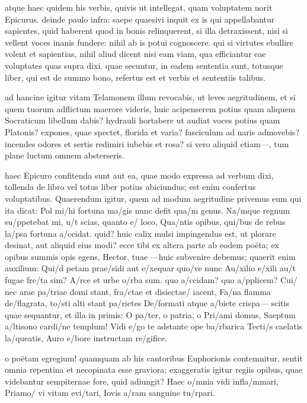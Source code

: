  atque haec quidem his verbis, quivis ut intellegat, quam voluptatem norit Epicurus. deinde paulo infra: saepe quaesivi inquit ex is qui appellabantur sapientes, quid haberent quod in bonis relinquerent, si illa detraxissent, nisi si vellent voces inanis fundere: nihil ab is potui cognoscere. qui si virtutes ebullire volent et sapientias, nihil aliud dicent nisi eam viam, qua efficiantur eae voluptates quas supra dixi. quae secuntur, in eadem sententia sunt, totusque liber, qui est de summo bono, refertus est et verbis et sententiis talibus.

 ad hancine igitur vitam Telamonem illum revocabis, ut leves aegritudinem, et si quem tuorum adflictum maerore videris, huic acipenserem potius quam aliquem Socraticum libellum dabis? hydrauli hortabere ut audiat voces potius quam Platonis? expones, quae spectet, florida et varia? fasciculum ad naris admovebis? incendes odores et sertis redimiri iubebis et rosa? si vero aliquid etiam—, tum plane luctum omnem absterseris.

 haec Epicuro confitenda sunt aut ea, quae modo expressa ad verbum dixi, tollenda de libro vel totus liber potius abiciundus; est enim confertus voluptatibus. Quaerendum igitur, quem ad modum aegritudine privemus eum qui ita dicat: Pol mi/hi fortuna ma/gis nunc defit qua/m genus. Na/mque regnum su/ppetebat mi, u/t scias, quanto e/ loco, Qua/ntis opibus, qui/bus de rebus la/psa fortuna a/ccidat. quid? huic calix mulsi impingendus est, ut plorare desinat, aut aliquid eius modi? ecce tibi ex altera parte ab eodem poëta; ex opibus summis opis egens, Hector, tuae —huic subvenire debemus; quaerit enim auxilium: Qui/d petam prae/sidi aut e/xequar quo/ve nunc Au/xilio e/xili au/t fugae fre/ta sim? A/rce et urbe o/rba sum. quo a/ccidam? quo a/pplicem? Cui/ nec arae pa/triae domi stant, fra/ctae et disiectae/ iacent, Fa/na flamma de/flagrata, to/sti alti stant pa/rietes De/formati atque a/biete crispa— scitis quae sequantur, et illa in primis: O pa/ter, o patria, o Pri/ami domus, Saeptum a/ltisono cardi/ne templum! Vidi e/go te adstante ope ba/rbarica Tecti/s caelatis la/queatis, Auro e/bore instructam re/gifice.

 o poëtam egregium! quamquam ab his cantoribus Euphorionis contemnitur. sentit omnia repentina et necopinata esse graviora; exaggeratis igitur regiis opibus, quae videbantur sempiternae fore, quid adiungit? Haec o/mnia vidi infla/mmari, Priamo/ vi vitam evi/tari, Iovis a/ram sanguine tu/rpari.

